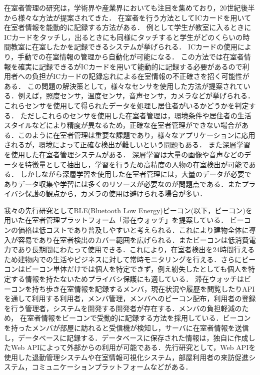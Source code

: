 在室者管理の研究は，学術界や産業界においても注目を集めており，20世紀後半から様々な方法が提案されてきた．
在室者を行う方法としてICカードを用いて在室者情報を能動的に記録する方法がある．
例として学生が教室に入るときにICカードをタッチし，出るときにも同様にタッチすると学生がどのくらいの時間教室に在室したかを記録できるシステムが挙げられる． ICカードの使用により，手動での在室情報の管理から自動化が可能になる．
この方法では在室者情報を確実に記録できるがICカードを用いて能動的に記録する必要があるので利用者への負担がICカードの記録忘れによる在室情報の不正確さを招く可能性がある．
この問題の解決策として，様々なセンサを使用した方法が提案されている．例えば，照度センサ，温度センサ，音声センサ，カメラなどが挙げられる．これらセンサを使用して得られたデータを処理し居住者がいるかどうかを判定する．
ただしこれらのセンサを使用した在室者管理は，環境条件や居住者の生活スタイルなどにより精度が異なるため，正確な在室者管理ができない場合がある．このように在室者管理は重要な課題であり，様々なアプリケーションに応用されるが，環境によって正確な検出が難しいという問題もある．
また深層学習を使用した在室者管理システムがある．
深層学習は大量の画像や音声などのデータを特徴量として抽出し，学習を行うため高精度の人物の在室検出が可能である．
しかしながら深層学習を使用した在室者管理には，大量のデータが必要でありデータ収集や学習には多くのリソースが必要なのが問題点である．またプライバシ保護の観点から，カメラの使用は避けられる場合が多い．

我々の先行研究としてBLE(Bluetooth Low Energy)ビーコン(以下，ビーコン)を用いた在室者管理プラットフォーム「滞在ウォッチ」を提案している．
ビーコンの価格は低コストであり普及しやすいと考えられる．これにより建物全体に導入が容易であり在室者検出のカバー範囲を広げられる．またビーコンは低消費電力であり長期間にわたって使用できる．これにより，在室者検出を24時間行えるため建物内での生活やビジネスに対して常時モニタリングを行える．さらにビーコンはビーコン単体だけでは個人を特定できず，例え紛失したとしても個人を特定する情報を持たないためプライバシ保護にも適している．
滞在ウォッチはビーコンを持ち歩き在室情報を記録するメンバ，現在状況や履歴を閲覧したりAPIを通して利用する利用者，メンバ管理，メンバへのビーコン配布，利用者の登録を行う管理者，システムを開発する開発者が存在する．メンバの負担軽減のため，
在室者情報をビーコンで受動的に記録する方法を採用している．ビーコンを持ったメンバが部屋に訪れると受信機が検知し，サーバに在室者情報を送信し，データベースに記録する．データベースに保存された情報は，独自に作成したWeb APIによって外部からの利用が可能である．先行研究として，Web APIを使用した退勤管理システムや在室情報可視化システム，部屋利用者の来訪促進システム，コミュニケーションプラットフォームなどがある．


